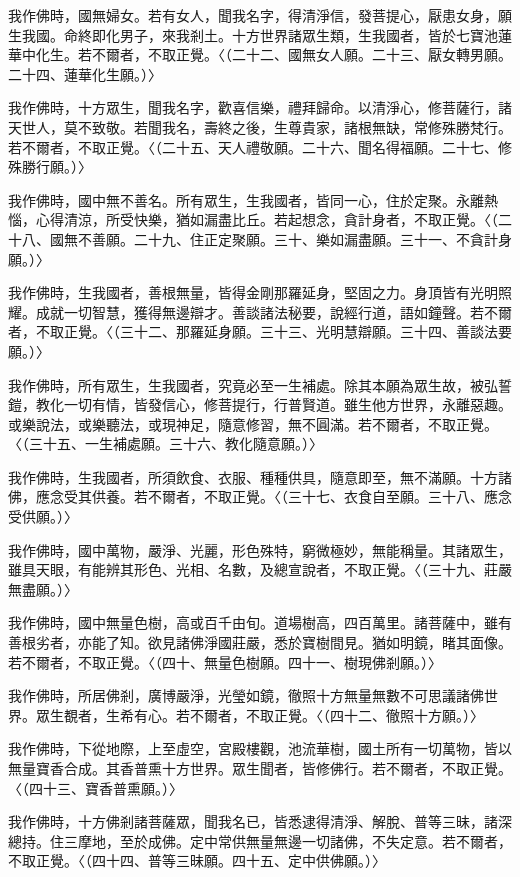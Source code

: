 \documentclass{zhvt-classic}
\begin{document}
我作佛時，國無婦女。若有女人，聞我名字，得清淨信，發菩提心，厭患女身，願生我國。命終即化男子，來我剎土。十方世界諸眾生類，生我國者，皆於七寶池蓮華中化生。若不爾者，不取正覺。〈（二十二、國無女人願。二十三、厭女轉男願。二十四、蓮華化生願。）〉

我作佛時，十方眾生，聞我名字，歡喜信樂，禮拜歸命。以清淨心，修菩薩行，諸天世人，莫不致敬。若聞我名，壽終之後，生尊貴家，諸根無缺，常修殊勝梵行。若不爾者，不取正覺。〈（二十五、天人禮敬願。二十六、聞名得福願。二十七、修殊勝行願。）〉

我作佛時，國中無不善名。所有眾生，生我國者，皆同一心，住於定聚。永離熱惱，心得清涼，所受快樂，猶如漏盡比丘。若起想念，貪計身者，不取正覺。〈（二十八、國無不善願。二十九、住正定聚願。三十、樂如漏盡願。三十一、不貪計身願。）〉

我作佛時，生我國者，善根無量，皆得金剛那羅延身，堅固之力。身頂皆有光明照耀。成就一切智慧，獲得無邊辯才。善談諸法秘要，說經行道，語如鐘聲。若不爾者，不取正覺。〈（三十二、那羅延身願。三十三、光明慧辯願。三十四、善談法要願。）〉

我作佛時，所有眾生，生我國者，究竟必至一生補處。除其本願為眾生故，被弘誓鎧，教化一切有情，皆發信心，修菩提行，行普賢道。雖生他方世界，永離惡趣。或樂說法，或樂聽法，或現神足，隨意修習，無不圓滿。若不爾者，不取正覺。〈（三十五、一生補處願。三十六、教化隨意願。）〉

我作佛時，生我國者，所須飲食、衣服、種種供具，隨意即至，無不滿願。十方諸佛，應念受其供養。若不爾者，不取正覺。〈（三十七、衣食自至願。三十八、應念受供願。）〉

我作佛時，國中萬物，嚴淨、光麗，形色殊特，窮微極妙，無能稱量。其諸眾生，雖具天眼，有能辨其形色、光相、名數，及總宣說者，不取正覺。〈（三十九、莊嚴無盡願。）〉

我作佛時，國中無量色樹，高或百千由旬。道場樹高，四百萬里。諸菩薩中，雖有善根劣者，亦能了知。欲見諸佛淨國莊嚴，悉於寶樹間見。猶如明鏡，睹其面像。若不爾者，不取正覺。〈（四十、無量色樹願。四十一、樹現佛剎願。）〉

我作佛時，所居佛剎，廣博嚴淨，光瑩如鏡，徹照十方無量無數不可思議諸佛世界。眾生覩者，生希有心。若不爾者，不取正覺。〈（四十二、徹照十方願。）〉

我作佛時，下從地際，上至虛空，宮殿樓觀，池流華樹，國土所有一切萬物，皆以無量寶香合成。其香普熏十方世界。眾生聞者，皆修佛行。若不爾者，不取正覺。〈（四十三、寶香普熏願。）〉

我作佛時，十方佛剎諸菩薩眾，聞我名已，皆悉逮得清淨、解脫、普等三昧，諸深總持。住三摩地，至於成佛。定中常供無量無邊一切諸佛，不失定意。若不爾者，不取正覺。〈（四十四、普等三昧願。四十五、定中供佛願。）〉
\end{document}
